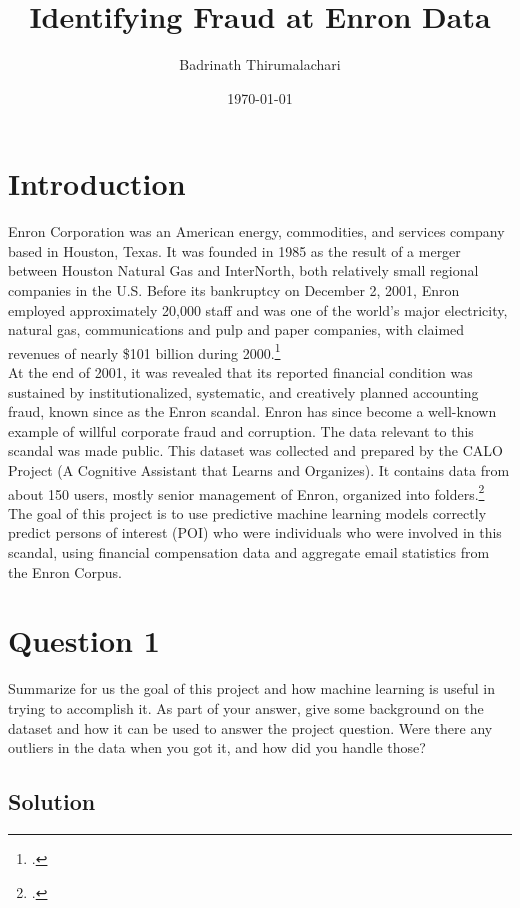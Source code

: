 \documentclass[12pt]{article}%
\begin{document}
\title{Identifying Fraud at Enron Data}
\author{Badrinath Thirumalachari}
\date{\today}
\maketitle 
 

\section*{Introduction}

Enron Corporation was an American energy, commodities, and services company based in Houston, Texas. It was founded in 1985 as the result of a merger between Houston Natural Gas and InterNorth, both relatively small regional companies in the U.S. Before its bankruptcy on December 2, 2001, Enron employed approximately 20,000 staff and was one of the world's major electricity, natural gas, communications and pulp and paper companies, with claimed revenues of nearly \$101 billion during 2000.\footcite{https://en.wikipedia.org/wiki/Enron}
\\
At the end of 2001, it was revealed that its reported financial condition was sustained by institutionalized, systematic, and creatively planned accounting fraud, known since as the Enron scandal. Enron has since become a well-known example of willful corporate fraud and corruption. The data relevant to this scandal was made public. This dataset was collected and prepared by the CALO Project (A Cognitive Assistant that Learns and Organizes). It contains data from about 150 users, mostly senior management of Enron, organized into folders.\footcite{https://en.wikipedia.org/wiki/Enron}
\\
The goal of this project is to use predictive machine learning models correctly predict persons of interest (POI) who were individuals who were involved in this scandal, using financial compensation data and aggregate email statistics from the Enron Corpus.
\printbibliography
\newpage
\section*{Question 1}

Summarize for us the goal of this project and how machine learning is useful in trying to accomplish it. As part of your answer, give some background on the dataset and how it can be used to answer the project question. Were there any outliers in the data when you got it, and how did you handle those?

\subsection*{Solution}
\end{document}
